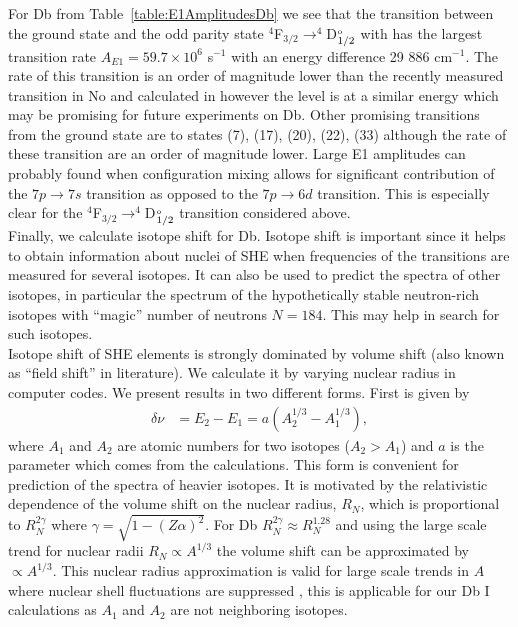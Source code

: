 \documentclass[10pt,a4paper, twoside, openright]{report}
\begin{document}
For Db from Table~\ref{table:E1AmplitudesDb} we see that the  transition between the ground state and the odd parity state $^4$F$_{3/2} \rightarrow ^4$D$^{\rm_o}_{1/2}$ with has the largest transition rate $A_{E1} = 59.7 \times 10^{6}$ s$^{-1}$ with an energy difference 29 886 cm$^{-1}$. The rate of this transition is an order of magnitude lower than the recently measured transition in No \cite{Laatiaoui2016} and calculated in \cite{Borschevsky2007, Indelicato2007, Liu2007} however the level is at a similar energy which may be promising for future experiments on Db. Other promising transitions from the ground state are to states (7), (17), (20), (22), (33) although the rate of these transition are an order of magnitude lower.  
Large E1 amplitudes can probably found when configuration mixing allows for significant contribution of the 
$7p \rightarrow 7s$ transition as opposed to the  $7p \rightarrow 6d$ transition. This is especially clear for the 
$^4$F$_{3/2} \rightarrow ^4$D$^{\rm_o}_{1/2}$ transition considered above. \\
\linebreak
Finally, we calculate isotope shift for Db. Isotope shift is important since it helps to obtain information about
nuclei of SHE when frequencies of the transitions are measured for several isotopes. It can also be used 
to predict the spectra of other isotopes, in particular the spectrum of the hypothetically stable neutron-rich 
isotopes with ``magic'' number of neutrons $N=184$. This may help in search for such isotopes.\\
\linebreak
Isotope shift of SHE elements is strongly dominated by volume shift (also known as ``field shift'' in literature). We calculate it by varying nuclear radius in 
computer codes. We present results in two different forms. First is given by~\cite{DFW17}
\begin{align} \label{eq:DbISa}
\delta \nu &= E_{2} - E_{1} = a\left(A_{2}^{1/3} - A_{1}^{1/3}\right),
\end{align}
where $A_1$ and $A_2$ are atomic numbers for two isotopes ($A_2>A_1$) and $a$ is the parameter which
comes from the calculations. This form is convenient for prediction of the spectra of heavier isotopes. It is motivated by the relativistic dependence of the volume shift on the nuclear radius, $R_N$, which is proportional to $R_N^{2\gamma}$ where $\gamma = \sqrt{1 - (Z\alpha)^2}$. For  Db  $R_N^{ 2\gamma}  \approx R_{N}^{1.28}$ and using the large scale trend for nuclear radii $R_N \propto A^{1/3}$  the volume shift can be approximated by $\propto A^{1/3}$. This nuclear radius approximation is valid for large scale trends in $A$ where nuclear shell fluctuations are suppressed \cite{Angeli2013, DFW17}, this is applicable for our Db I calculations as $A_1$ and $A_2$ are not neighboring isotopes. \\
\end{document}

